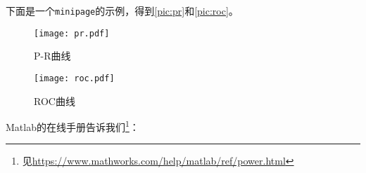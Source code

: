 \documentclass{dreamClass}
\begin{document}
下面是一个\texttt{minipage}的示例，得到\autoref{pic:pr}和\autoref{pic:roc}。
\begin{figure}
    \centering
    \begin{minipage}{.5\textwidth}
        \centering
        \texttt{[image: pr.pdf]}
        \caption{P-R曲线\label{pic:pr}}
    \end{minipage}%
    \begin{minipage}{.5\textwidth}
        \centering
        \texttt{[image: roc.pdf]}
        \caption{ROC曲线\label{pic:roc}}
    \end{minipage}
\end{figure}

Matlab的在线手册告诉我们\footnote{见\href{https://www.mathworks.com/help/matlab/ref/power.html}{https://www.mathworks.com/help/matlab/ref/power.html}}：
\end{document}
